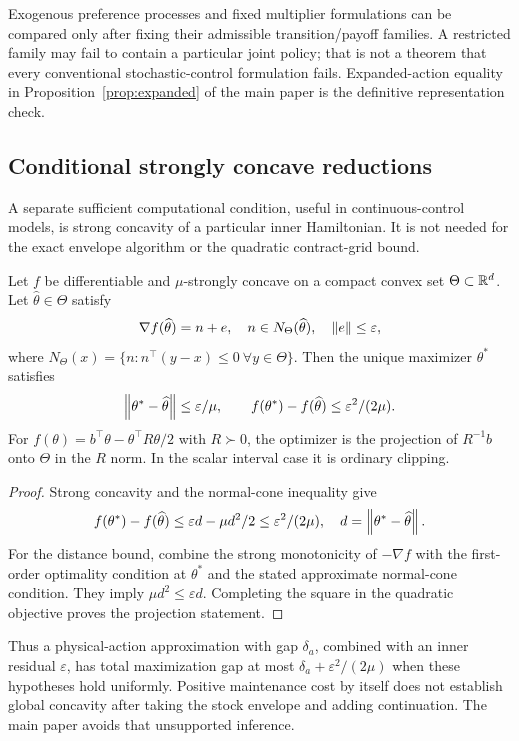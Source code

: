 Exogenous preference processes and fixed multiplier formulations can be compared only after fixing their admissible transition/payoff families. A restricted family may fail to contain a particular joint policy; that is not a theorem that every conventional stochastic-control formulation fails. Expanded-action equality in Proposition~\ref{prop:expanded} of the main paper is the definitive representation check.

\subsection{Conditional strongly concave reductions}
A separate sufficient computational condition, useful in continuous-control models, is strong concavity of a particular inner Hamiltonian. It is not needed for the exact envelope algorithm or the quadratic contract-grid bound.
\begin{proposition}
Let $f$ be differentiable and $\mu$-strongly concave on a compact convex set $\Theta\subset\mathbb R^d$. Let $\widehat\theta\in\Theta$ satisfy
\[
 \nabla f(\widehat\theta)=n+e,\quad n\in N_\Theta(\widehat\theta),\quad\left\lVert e\right\rVert\leq\varepsilon,
\]
where $N_\Theta(x)=\{n:n^\top(y-x)\leq0\ \forall y\in\Theta\}$. Then the unique maximizer $\theta^*$ satisfies
\[
 \left\lVert\theta^*-\widehat\theta\right\rVert\leq\varepsilon/\mu,
 \qquad f(\theta^*)-f(\widehat\theta)\leq\varepsilon^2/(2\mu).
\]
For $f(\theta)=b^\top\theta-\theta^\top R\theta/2$ with $R\succ0$, the optimizer is the projection of $R^{-1}b$ onto $\Theta$ in the $R$ norm. In the scalar interval case it is ordinary clipping.
\end{proposition}
\begin{proof}
Strong concavity and the normal-cone inequality give
\[
 f(\theta^*)-f(\widehat\theta)\leq\varepsilon d-\mu d^2/2\leq\varepsilon^2/(2\mu),
 \quad d=\left\lVert\theta^*-\widehat\theta\right\rVert.
\]
For the distance bound, combine the strong monotonicity of $-\nabla f$ with the first-order optimality condition at $\theta^*$ and the stated approximate normal-cone condition. They imply $\mu d^2\leq\varepsilon d$. Completing the square in the quadratic objective proves the projection statement.
\end{proof}
Thus a physical-action approximation with gap $\delta_a$, combined with an inner residual $\varepsilon$, has total maximization gap at most $\delta_a+\varepsilon^2/(2\mu)$ when these hypotheses hold uniformly. Positive maintenance cost by itself does not establish global concavity after taking the stock envelope and adding continuation. The main paper avoids that unsupported inference.

